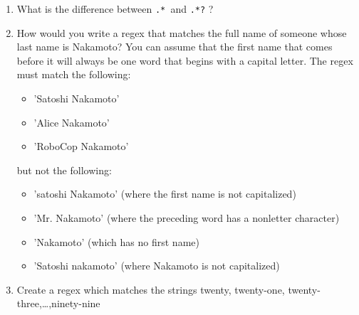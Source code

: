 \documentclass[12pt,letterpaper]{article}
\begin{document}
    \begin{enumerate}
    	\item What is the difference between \texttt{.* }and \texttt{.*?} ?
    	\item  How would you write a regex that matches the full name of someone
    	whose last name is Nakamoto? You can assume that the first name that
    	comes before it will always be one word that begins with a capital letter.
    	The regex must match the following:
    	\begin{itemize}
    		\item 'Satoshi Nakamoto'
    		\item 'Alice Nakamoto'
    		\item 'RoboCop Nakamoto'
    	\end{itemize}
    	but not the following:
    	\begin{itemize}
    		\item 'satoshi Nakamoto' (where the first name is not capitalized)
    		\item 'Mr. Nakamoto' (where the preceding word has a nonletter character)
    		\item 'Nakamoto' (which has no first name)
    		\item 'Satoshi nakamoto' (where Nakamoto is not capitalized)
    	\end{itemize}
    
    	\item Create a regex which matches the strings twenty, twenty-one, twenty-three,\dots,ninety-nine
    \end{enumerate}
\end{document}
